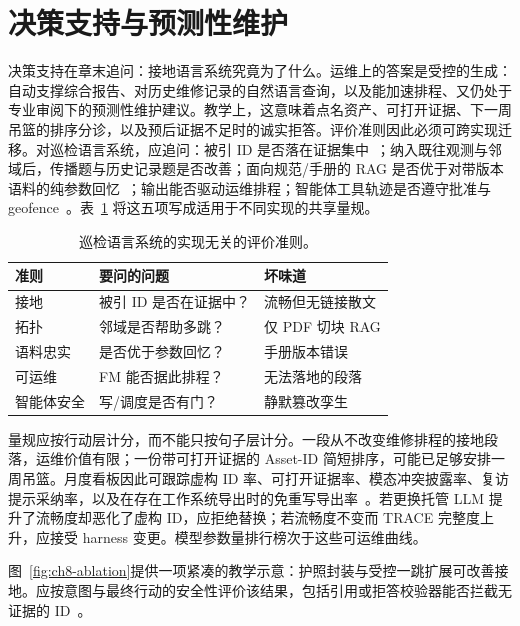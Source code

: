 \section{决策支持与预测性维护}
\label{sec:ch8-dss}

决策支持在章末追问：接地语言系统究竟为了什么。运维上的答案是受控的生成：自动支撑综合报告、对历史维修记录的自然语言查询，以及能加速排程、又仍处于专业审阅下的预测性维护建议。教学上，这意味着点名资产、可打开证据、下一周吊篮的排序分诊，以及预后证据不足时的诚实拒答。评价准则因此必须可跨实现迁移。对巡检语言系统，应追问：被引 ID 是否落在证据集中~\cite{ji2023,shuster2021}；纳入既往观测与邻域后，传播题与历史记录题是否改善；面向规范/手册的 RAG 是否优于对带版本语料的纯参数回忆~\cite{lee2024ragsafety,joffe2025buildingcodes,krutli2025fmrags}；输出能否驱动运维排程；智能体工具轨迹是否遵守批准与 geofence~\cite{luo2025llmdtrobot,rawat2025llmmas}。表~\ref{tab:ch8-eval} 将这五项写成适用于不同实现的共享量规。

\begin{table}[htbp]
\centering
\caption{巡检语言系统的实现无关的评价准则。}
\label{tab:ch8-eval}
\begin{tabular}{llp{4.8cm}}
\toprule
准则 & 要问的问题 & 坏味道 \\
\midrule
接地 & 被引 ID 是否在证据中？ & 流畅但无链接散文 \\
拓扑 & 邻域是否帮助多跳？ & 仅 PDF 切块 RAG \\
语料忠实 & 是否优于参数回忆？ & 手册版本错误 \\
可运维 & FM 能否据此排程？ & 无法落地的段落 \\
智能体安全 & 写/调度是否有门？ & 静默篡改孪生 \\
\bottomrule
\end{tabular}
\end{table}

量规应按行动层计分，而不能只按句子层计分。一段从不改变维修排程的接地段落，运维价值有限；一份带可打开证据的 Asset-ID 简短排序，可能已足够安排一周吊篮。月度看板因此可跟踪虚构 ID 率、可打开证据率、模态冲突披露率、复访提示采纳率，以及在存在工作系统导出时的免重写导出率~\cite{lee2024ragsafety,luo2025llmdtrobot,rawat2025llmmas,liang2023helm}。若更换托管 LLM 提升了流畅度却恶化了虚构 ID，应拒绝替换；若流畅度不变而 TRACE 完整度上升，应接受 harness 变更。模型参数量排行榜次于这些可运维曲线。

图~\ref{fig:ch8-ablation}提供一项紧凑的教学示意：护照封装与受控一跳扩展可改善接地。应按意图与最终行动的安全性评价该结果，包括引用或拒答校验器能否拦截无证据的 ID~\cite{ji2023,peng2024,lee2024ragsafety}。

